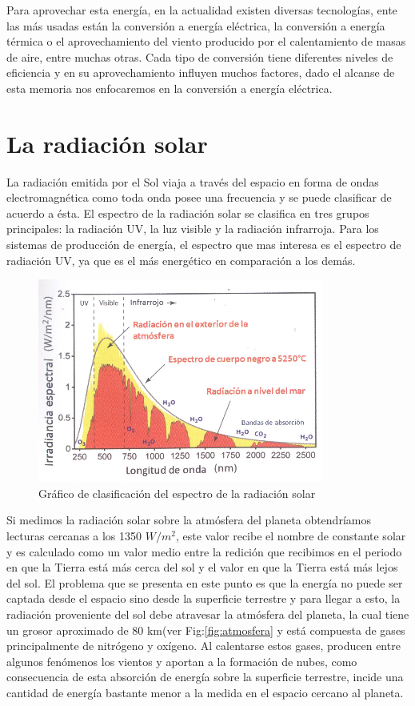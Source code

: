 Para aprovechar esta energía, en la actualidad existen diversas tecnologías, ente las más usadas están la conversión a energía eléctrica, la conversión a energía térmica o el aprovechamiento del viento producido por el calentamiento de masas de aire, entre muchas otras. Cada tipo de conversión tiene diferentes niveles de eficiencia y en su aprovechamiento influyen muchos factores, dado el alcanse de esta memoria nos enfocaremos en la conversión a energía eléctrica.\\

\section{La radiación solar}
La radiación emitida por el Sol viaja a través del espacio en forma de ondas electromagnética como toda onda posee una frecuencia y se puede clasificar de acuerdo a ésta. El espectro de la radiación solar se clasifica en tres grupos principales: la radiación UV, la luz visible y la radiación infrarroja. Para los sistemas de producción de energía, el espectro que mas interesa es el espectro de radiación UV, ya que es el más energético en comparación a los demás.

\begin{figure}[h!]
        \centering
        \includegraphics[scale=0.7]{images/espectroSolar}
        \caption{Gráfico de clasificación del espectro de la radiación solar\cite{recursoSolar:1}}
\end{figure}

Si medimos la radiación solar sobre la atmósfera del planeta obtendríamos lecturas cercanas a los 1350 $W/{m}^{2}$, este valor recibe el nombre de constante solar y es calculado como un valor medio entre la redición que recibimos en el periodo en que la Tierra está más cerca del sol y el valor en que la Tierra está más lejos del sol. El problema que se presenta en este punto es que la energía no puede ser captada desde el espacio sino desde la superficie terrestre y para llegar a esto, la radiación proveniente del sol debe atravesar la atmósfera del planeta, la cual tiene un grosor aproximado de 80 km(ver Fig:\ref{fig:atmosfera} y está compuesta de gases principalmente de nitrógeno y oxígeno\cite{recursoSolar:1}. Al calentarse estos gases, producen entre algunos fenómenos los vientos y aportan a la formación de nubes, como consecuencia de esta absorción de energía sobre la superficie terrestre, incide una cantidad de energía bastante menor a la medida en el espacio cercano al planeta.


